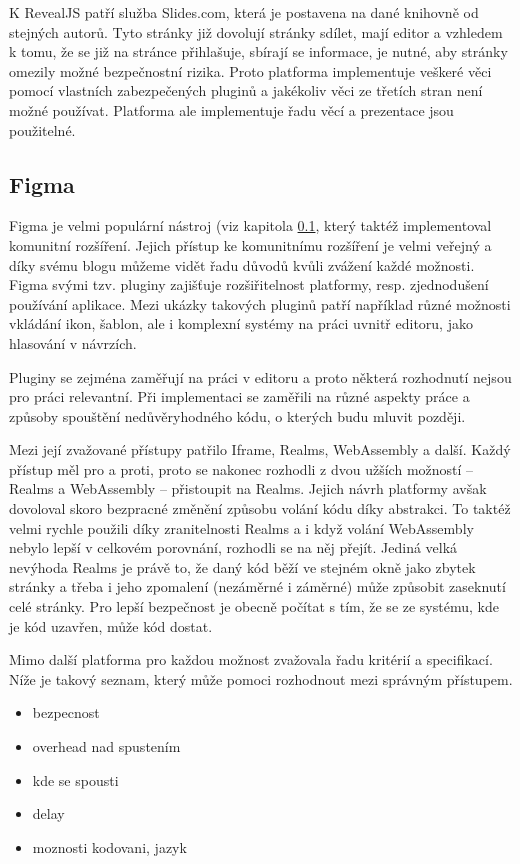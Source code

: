K RevealJS patří služba Slides.com, která je postavena na dané knihovně od stejných autorů.
Tyto stránky již dovolují stránky sdílet, mají editor a vzhledem k tomu, že se již na stránce přihlašuje, sbírají se informace, je nutné, aby stránky omezily možné bezpečnostní rizika.
Proto platforma implementuje veškeré věci pomocí vlastních zabezpečených pluginů a jakékoliv věci ze třetích stran není možné používat.
Platforma ale implementuje řadu věcí a prezentace jsou použitelné.

\subsection{Figma}\label{text:figma}

Figma je velmi populární nástroj (viz kapitola \ref{text:figma}, který taktéž implementoval komunitní rozšíření.
Jejich přístup ke komunitnímu rozšíření je velmi veřejný a díky svému blogu můžeme vidět řadu důvodů kvůli zvážení každé možnosti.
Figma svými tzv. pluginy zajišťuje rozšiřitelnost platformy, resp. zjednodušení používání aplikace.
Mezi ukázky takových pluginů patří například různé možnosti vkládání ikon, šablon, ale i komplexní systémy na práci uvnitř editoru, jako hlasování v návrzích.

Pluginy se zejména zaměřují na práci v editoru a proto některá rozhodnutí nejsou pro práci relevantní.
Při implementaci se zaměřili na různé aspekty práce a způsoby spouštění nedůvěryhodného kódu, o kterých budu mluvit později.

Mezi její zvažované přístupy patřilo Iframe, Realms, WebAssembly a další.
Každý přístup měl pro a proti, proto se nakonec rozhodli z dvou užších možností -- Realms a WebAssembly -- přistoupit na Realms.
Jejich návrh platformy avšak dovoloval skoro bezpracné změnění způsobu volání kódu díky abstrakci.
To taktéž velmi rychle použili díky zranitelnosti Realms a i když volání WebAssembly nebylo lepší v celkovém porovnání, rozhodli se na něj přejít.
Jediná velká nevýhoda Realms je právě to, že daný kód běží ve stejném okně jako zbytek stránky a třeba i jeho zpomalení (nezáměrné i záměrné) může způsobit zaseknutí celé stránky.
Pro lepší bezpečnost je obecně počítat s tím, že se ze systému, kde je kód uzavřen, může kód dostat.

Mimo další platforma pro každou možnost zvažovala řadu kritérií a specifikací. 
Níže je takový seznam, který může pomoci rozhodnout mezi správným přístupem.

\begin{itemize}
    \item bezpecnost
    \item overhead nad spustením
    \item kde se spousti
    \item delay
    \item moznosti kodovani, jazyk
\end{itemize}

